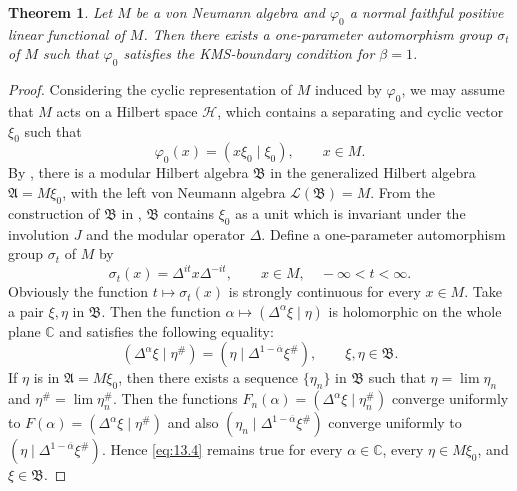 \documentclass[12pt,b5paper,twoside]{article}
\theoremstyle{takesaki}
\newtheorem{theorem}{Theorem}[section]
\numberwithin{equation}{section}
\begin{document}
\begin{theorem}\label{thm:13.1}
Let $M$ be a von Neumann algebra and $\varphi_0$ a normal faithful
positive linear functional of $M$.  Then there exists a one-parameter
automorphism group $\sigma_t$ of $M$ such that $\varphi_0$ satisfies
the KMS-boundary condition for $\beta=1$.
\end{theorem}

\begin{proof}
Considering the cyclic representation of $M$ induced by $\varphi_0$,
we may assume that $M$ acts on a Hilbert space $\mathcal H$, which
contains a separating and cyclic vector $\xi_0$ such that
\[
  \varphi_0(x)=(x\xi_0\mid\xi_0),
  \qquad x\in M.
\]
By , there is a modular Hilbert algebra $\mathfrak B$
in the generalized Hilbert algebra $\mathfrak A=M\xi_0$, with the
left von Neumann algebra $\mathcal L(\mathfrak B)=M$.  From the
construction of $\mathfrak B$ in , $\mathfrak B$
contains $\xi_0$ as a unit which is invariant under the involution
$J$ and the modular operator $\Delta$.  Define a one-parameter
automorphism group $\sigma_t$ of $M$ by
\begin{equation}
  \sigma_t(x)=\Delta^{it}x\Delta^{-it},
  \qquad x\in M,\quad -\infty<t<\infty.
  \tag{13.3}\label{eq:13.3}
\end{equation}
Obviously the function $t\mapsto\sigma_t(x)$ is strongly continuous
for every $x\in M$.  Take a pair $\xi,\eta$ in $\mathfrak B$.  Then
the function $\alpha\mapsto(\Delta^\alpha\xi\mid\eta)$ is
holomorphic on the whole plane $\mathbb C$ and satisfies the
following equality:
\begin{equation}
  (\Delta^\alpha\xi\mid\eta^{\#})
  =(\eta\mid\Delta^{1-\overline\alpha}\xi^{\#}),
  \qquad \xi,\eta\in\mathfrak B.
  \tag{13.4}\label{eq:13.4}
\end{equation}
If $\eta$ is in $\mathfrak A=M\xi_0$, then there exists a sequence
$\{\eta_n\}$ in $\mathfrak B$ such that
$\eta=\lim\eta_n$ and $\eta^{\#}=\lim\eta_n^{\#}$.  Then the functions
$F_n(\alpha)=(\Delta^\alpha\xi\mid\eta_n^{\#})$
converge uniformly to $F(\alpha)=(\Delta^\alpha\xi\mid\eta^{\#})$
and also $(\eta_n\mid\Delta^{1-\overline\alpha}\xi^{\#})$ converge
uniformly to
$(\eta\mid\Delta^{1-\overline\alpha}\xi^{\#})$.  Hence
\eqref{eq:13.4} remains true for every $\alpha\in\mathbb C$, every
$\eta\in M\xi_0$, and $\xi\in\mathfrak B$.


\end{proof}
\end{document}
